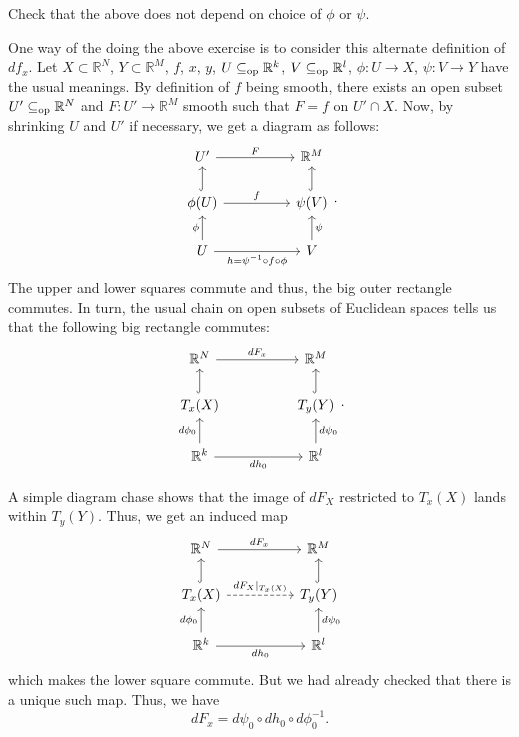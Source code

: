 \begin{exe}
	Check that the above does not depend on choice of $\phi$ or $\psi$.
\end{exe}

One way of the doing the above exercise is to consider this alternate definition of $df_{x}$. Let $X \subset \mathbb{R}^{N}$, $Y \subset \mathbb{R}^{M}$, $f$, $x$, $y$, $U \subseteq_{\operatorname{op}} \mathbb{R}^{k}$, $V \subseteq_{\operatorname{op}} \mathbb{R}^{l}$, $\phi : U \to X$, $\psi : V \to Y$ have the usual meanings. \newline
By definition of $f$ being smooth, there exists an open subset $U' \subseteq_{\operatorname{op}} \mathbb{R}^{N}$ and $F : U' \to \mathbb{R}^{M}$ smooth such that $F = f$ on $U' \cap X$. Now, by shrinking $U$ and $U'$ if necessary, we get a diagram as follows:
\begin{equation*} 
	\begin{tikzcd}
		U' \arrow[rr, "F"] & & \mathbb{R}^{M} \\
		\phi(U) \arrow[u, hook] \arrow[rr, "f"] & & \psi(V) \arrow[u, hook] \\
		U \arrow[u, "\phi"] \arrow[rr, "h = \psi^{-1} \circ f \circ \phi"'] & & V \arrow[u, "\psi"']
	\end{tikzcd}.
\end{equation*}
The upper and lower squares commute and thus, the big outer rectangle commutes. In turn, the usual chain on open subsets of Euclidean spaces tells us that the following big rectangle commutes:
\begin{equation*} 
	\begin{tikzcd}
		\mathbb{R}^{N} \arrow[rr, "dF_{x}"] & & \mathbb{R}^{M} \\
		T_{x}(X) \arrow[u, hook] & & T_{y}(Y) \arrow[u, hook] \\
		\mathbb{R}^{k} \arrow[u, "d\phi_{0}"] \arrow[rr, "dh_{0}"'] & & \mathbb{R}^{l} \arrow[u, "d\psi_{0}"']
	\end{tikzcd}.
\end{equation*}

A simple diagram chase shows that the image of $dF_{X}$ restricted to $T_{x}(X)$ lands within $T_{y}(Y)$. Thus, we get an induced map
\begin{equation*} 
	\begin{tikzcd}
		\mathbb{R}^{N} \arrow[rr, "dF_{x}"] & & \mathbb{R}^{M} \\
		T_{x}(X) \arrow[u, hook] \arrow[rr, dashed, "dF_{X}|_{T_{x}(X)}"] & & T_{y}(Y) \arrow[u, hook] \\
		\mathbb{R}^{k} \arrow[u, "d\phi_{0}"] \arrow[rr, "dh_{0}"'] & & \mathbb{R}^{l} \arrow[u, "d\psi_{0}"']
	\end{tikzcd}
\end{equation*}
which makes the lower square commute. But we had already checked that there is a unique such map. Thus, we have
\begin{equation*} 
	dF_{x} = d\psi_{0} \circ dh_{0} \circ d\phi_{0}^{-1}.
\end{equation*}

